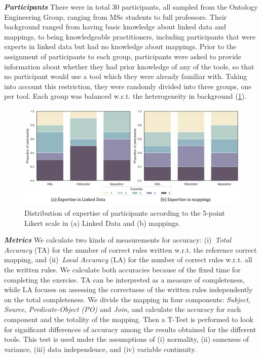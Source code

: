 \noindent\textit{\textbf{Participants}} 
There were in total 30 participants, all sampled from the Ontology Engineering Group, ranging from MSc students to full professors. Their background ranged from having basic knowledge about linked data and mappings, to being knowledgeable practitioners, including participants that were experts in linked data but had no knowledge about mappings. Prior to the assignment of participants to each group, participants were asked to provide information about whether they had prior knowledge of any of the tools, so that no participant would use a tool which they were already familiar with. Taking into account this restriction, they were randomly divided into three groups, one per tool. Each group was balanced w.r.t. the heterogeneity in background (\cref{fig:chp5-1_expertise}). 


\begin{figure}[!t]
\centering
\includegraphics[width=1\linewidth]{figures/chp5-1_expertise.pdf}
\caption[Expertise of participants of the user study]{Distribution of expertise of participants according to the 5-point Likert scale in (a) Linked Data and (b) mappings.}
\label{fig:chp5-1_expertise}
\end{figure}

\noindent\textit{\textbf{Metrics}} 
We calculate two kinds of measurements for accuracy: (i)~\textit{Total Accuracy} (TA) for the number of correct rules written w.r.t. the reference correct mapping, and (ii)~\textit{Local Accuracy} (LA) for the number of correct rules w.r.t. all the written rules. We calculate both accuracies because of the fixed time for completing the exercise. TA can be interpreted as a measure of completeness, while LA focuses on assessing the correctness of the written rules independently on the total completeness.
We divide the mapping in four components: \textit{Subject}, \textit{Source}, \textit{Predicate-Object (PO)} and \textit{Join}, and calculate the accuracy for each component and the totality of the mapping. Then a T-Test is performed to look for significant differences of accuracy among the results obtained for the different tools. This test is used under the assumptions of (i) normality, (ii) sameness of variance, (iii) data independence, and (iv) variable continuity.



